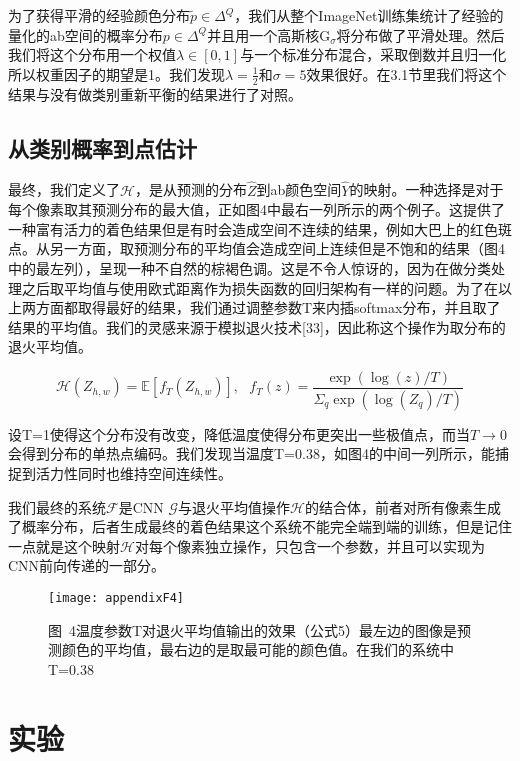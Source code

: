 为了获得平滑的经验颜色分布$\tilde{p} \in \Delta^Q$，我们从整个ImageNet训练集统计了经验的量化的ab空间的概率分布$p \in \Delta^Q$并且用一个高斯核$\text{G}_{\sigma}$将分布做了平滑处理。然后我们将这个分布用一个权值$\lambda \in [0,1]$与一个标准分布混合，采取倒数并且归一化所以权重因子的期望是1。我们发现$\lambda = \frac{1}{2}$和$\sigma = 5$效果很好。在3.1节里我们将这个结果与没有做类别重新平衡的结果进行了对照。

\subsection{从类别概率到点估计}

最终，我们定义了$\mathcal{H}$，是从预测的分布$\hat{Z}$到ab颜色空间$\hat{Y}$的映射。一种选择是对于每个像素取其预测分布的最大值，正如图4中最右一列所示的两个例子。这提供了一种富有活力的着色结果但是有时会造成空间不连续的结果，例如大巴上的红色斑点。从另一方面，取预测分布的平均值会造成空间上连续但是不饱和的结果（图4中的最左列），呈现一种不自然的棕褐色调。这是不令人惊讶的，因为在做分类处理之后取平均值与使用欧式距离作为损失函数的回归架构有一样的问题。为了在以上两方面都取得最好的结果，我们通过调整参数T来内插softmax分布，并且取了结果的平均值。我们的灵感来源于模拟退火技术[33]，因此称这个操作为取分布的退火平均值。

\begin{equation}\tag*{(5)}
\mathcal{H}(Z_{h,w}) = \mathbb{E}[f_T(Z_{h,w})], \text{ } f_T(z) = \frac{\exp(\log(z)/T)}{\Sigma_q\exp(\log(Z_q)/T)}
\end{equation}

设T=1使得这个分布没有改变，降低温度使得分布更突出一些极值点，而当$T \rightarrow 0$会得到分布的单热点编码。我们发现当温度T=0.38，如图4的中间一列所示，能捕捉到活力性同时也维持空间连续性。

我们最终的系统$\mathcal{F}$是CNN $\mathcal{G}$与退火平均值操作$\mathcal{H}$的结合体，前者对所有像素生成了概率分布，后者生成最终的着色结果这个系统不能完全端到端的训练，但是记住一点就是这个映射$\mathcal{H}$对每个像素独立操作，只包含一个参数，并且可以实现为CNN前向传递的一部分。

\begin{figure}[h]
  \centering
  \texttt{[image: appendixF4]}
  \caption*{图~4\quad 温度参数T对退火平均值输出的效果（公式5）最左边的图像是预测颜色的平均值，最右边的是取最可能的颜色值。在我们的系统中T=0.38}
  \label{tab:badfigure4}
\end{figure}

\section{实验}

